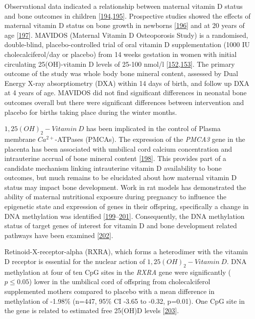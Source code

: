 \documentclass[
]{book}
\begin{document}
Observational data indicated a relationship between maternal vitamin D status and bone outcomes in children
{[}\protect\hyperlink{ref-Mahon2010a}{194},\protect\hyperlink{ref-Viljakainen2010}{195}{]}.
Prospective studies showed the effects of maternal vitamin D status on bone growth in newborns {[}\protect\hyperlink{ref-Viljakainen2011}{196}{]} and at 20 years of age {[}\protect\hyperlink{ref-Zhu2014a}{197}{]}.
MAVIDOS (Maternal Vitamin D Osteoporosis Study) is a randomised, double-blind, placebo-controlled trial of oral vitamin D supplementation (1000 IU cholecalciferol/day or placebo) from 14 weeks gestation in women with initial circulating 25(OH)-vitamin D levels of 25-100 nmol/l {[}\protect\hyperlink{ref-Harvey2012a}{152},\protect\hyperlink{ref-Cooper2016}{153}{]}.
The primary outcome of the study was whole body bone mineral content, assessed by Dual Energy X-ray absorptiometry (DXA) within 14 days of birth, and follow up DXA at 4 years of age.
MAVIDOS did not find significant differences in neonatal bone outcomes overall but there were significant differences between intervention and placebo for births taking place during the winter months.

\(1,25(OH)_2-Vitamin~D\) has been implicated in the control of Plasma membrane \(Ca^{2+}\)-ATPases (PMCAs).
The expression of the \emph{PMCA3} gene in the placenta has been associated with umbilical cord calcium concentration and intrauterine accrual of bone mineral content {[}\protect\hyperlink{ref-Kip2004}{198}{]}.
This provides part of a candidate mechanism linking intrauterine vitamin D availability to bone outcomes, but much remains to be elucidated about how maternal vitamin D status may impact bone development.
Work in rat models has demonstrated the ability of maternal nutritional exposure during pregnancy to influence the epigenetic state and expression of genes in their offspring, specifically a change in DNA methylation was identified {[}\protect\hyperlink{ref-Burdge2007a}{199}--\protect\hyperlink{ref-Burdge2007}{201}{]}.
Consequently, the DNA methylation status of target genes of interest for vitamin D and bone development related pathways have been examined {[}\protect\hyperlink{ref-Holroyd2012}{202}{]}.

Retinoid-X-receptor-alpha (RXRA), which forms a heterodimer with the vitamin D receptor is essential for the nuclear action of \(1,25(OH)_2-Vitamin~D\).
DNA methylation at four of ten CpG sites in the \emph{RXRA} gene were significantly (\(p\le0.05\)) lower in the umbilical cord of offspring from cholecalciferol supplemented mothers compared to placebo with a mean difference in methylation of -1.98\% (n=447, 95\% CI -3.65 to -0.32, p=0.01).
One CpG site in the gene is related to estimated free 25(OH)D levels {[}\protect\hyperlink{ref-Harvey2014d}{203}{]}.
\end{document}
